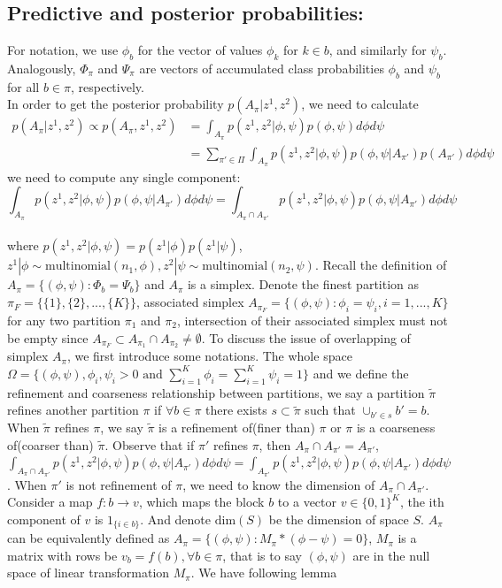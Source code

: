 \documentclass[11pt]{amsart}
\begin{document}
\subsection{Predictive and posterior probabilities:}
For notation, we use $\phi_b$ for the vector of values $\phi_k$ for $k \in b$,
and similarly for $\psi_b$. Analogously, $\Phi_\pi$ and $\Psi_\pi$
 are vectors of 
accumulated class probabilities $\phi_b$ and $\psi_b$ for all $b \in \pi$,
 respectively. \\
In order to get the posterior probability $p(A_\pi | z^1,z^2)$, we need to calculate 
\[
\begin{split}
p(A_\pi | z^1,z^2)\propto p(A_\pi, z^1,z^2) &= \int_{A_\pi} p(z^1,z^2|\phi,\psi)p(\phi,\psi) d\phi d\psi\\ 
&= \sum_{\pi'\in \Pi}\int_{A_\pi} p(z^1,z^2|\phi,\psi)p(\phi, \psi | A_{\pi'})p(A_{\pi'})d\phi d\psi
\end{split}
\]
we need to compute any single component:
\[
\int_{A_\pi} p(z^1,z^2|\phi,\psi)p(\phi, \psi | A_{\pi'})d\phi d\psi = \int_{A_\pi\cap A_{\pi'}}p(z^1,z^2|\phi,\psi)p(\phi, \psi | A_{\pi'})d\phi d\psi
\]
\\
where $p(z^1,z^2|\phi,\psi) = p(z^1|\phi)p(z^1|\psi)$, $z^1|\phi \sim \text{multinomial}(n_1, \phi), z^2|\psi \sim \text{multinomial}(n_2, \psi)$. Recall the definition of $A_\pi = \{(\phi,\psi): \Phi_b = \Psi_b\}$ and $A_\pi$ is a simplex. Denote the finest partition as $\pi_{F} = \{ \{1\}, \{2\},...,\{K\}\}$, associated simplex $A_{\pi_{F}} = \{(\phi, \psi): \phi_i = \psi_i, i = 1,...,K\}$ for any two partition $\pi_1$ and $\pi_2$, intersection of their associated simplex must not be empty since $A_{\pi_{F}}\subset A_{\pi_1}\cap A_{\pi_2} \neq \emptyset$.  To discuss the issue of overlapping of simplex $A_\pi$, we first introduce some notations. The whole space $\Omega = \{ (\phi,\psi), \phi_i,\psi_i > 0 \text{ and } \sum_{i=1}^K \phi_i = \sum_{i=1}^K \psi_i = 1\}$ and we define the refinement and coarseness relationship between partitions, we say a partition $\tilde{\pi}$ refines another partition $\pi$ if $\forall b \in \pi$ there exists $s \subset \tilde{\pi}$  such that $\cup_{b'\in s} b' = b$. When $\tilde{\pi}$ refines $\pi$, we say $\tilde{\pi}$ is a refinement of(finer than) $\pi$ or $\pi$ is a coarseness of(coarser than) $\tilde{\pi}$. 
Observe that if $\pi'$ refines $\pi$, then $A_\pi \cap A_{\pi'} = A_{\pi'}$, $\int_{A_\pi\cap A_{\pi'}} p(z^1,z^2|\phi,\psi)p(\phi, \psi | A_{\pi'})d\phi d\psi = \int_{A_{\pi'}} p(z^1,z^2|\phi,\psi)p(\phi, \psi | A_{\pi'})d\phi d\psi $. When $\pi'$ is not refinement of $\pi$, we need to know the dimension of $A_\pi\cap A_{\pi'}$. Consider a map $f: b \rightarrow v$, which maps the block $b$ to a vector $v\in \{0, 1\}^K$, the ith component of $v$ is $1_{\{i\in b\}}$. And denote $\text{dim}(S)$ be the dimension of space $S$. $A_\pi$ can be equivalently defined as $A_\pi =  \{(\phi,\psi): M_\pi * (\phi - \psi) = 0\}$, $M_\pi$ is a matrix with rows be $v_b = f(b), \forall b\in \pi$, that is to say $(\phi,\psi)$ are in the null space of linear transformation $M_\pi$.  We have following lemma\\
\end{document}
